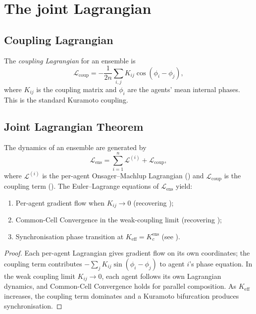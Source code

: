 \documentclass[11pt,twocolumn,a4paper]{article}
\newcommand{\Lag}{\mathcal{L}}
\newcommand{\Kc}{K_c}
\begin{document}
\section{The joint Lagrangian}
\label{sec:joint-lagrangian}

\subsection{Coupling Lagrangian}

\begin{definition}\label{def:lcoup}
The \emph{coupling Lagrangian} for an ensemble is
\[
\Lag_{\mathrm{coup}}=-\frac{1}{2n}\sum_{i,j}K_{ij}\cos(\phi_i-\phi_j),
\]
where $K_{ij}$ is the coupling matrix and $\phi_i$ are the agents'
mean internal phases. This is the standard Kuramoto coupling.
\end{definition}

\subsection{Joint Lagrangian Theorem}

\begin{theorem}\label{thm:joint-lag}
The dynamics of an ensemble are generated by
\[
\Lag_{\mathrm{ens}}=\sum_{i=1}^n\Lag^{(i)}+\Lag_{\mathrm{coup}},
\]
where $\Lag^{(i)}$ is the per-agent Onsager--Machlup Lagrangian
() and $\Lag_{\mathrm{coup}}$ is the coupling term
(). The Euler--Lagrange equations of $\Lag_{\mathrm{ens}}$
yield:
\begin{enumerate}[label=(\arabic*),leftmargin=*]
\item Per-agent gradient flow when $K_{ij}\to 0$ (recovering
);
\item Common-Cell Convergence in the weak-coupling limit
(recovering );
\item Synchronisation phase transition at $K_{\mathrm{eff}}=\Kc^{\mathrm{ens}}$
(see ).
\end{enumerate}
\end{theorem}

\begin{proof}
Each per-agent Lagrangian gives gradient flow on its own coordinates;
the coupling term contributes
$-\sum_j K_{ij}\sin(\phi_i-\phi_j)$ to agent $i$'s phase equation. In
the weak coupling limit $K_{ij}\to 0$, each agent follows its own
Lagrangian dynamics, and Common-Cell Convergence holds for parallel
composition. As $K_{\mathrm{eff}}$ increases, the coupling term
dominates and a Kuramoto bifurcation produces synchronisation.
\end{proof}
\end{document}
